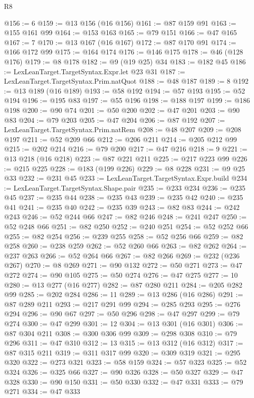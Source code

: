 \begin{lexlean}{R8}
\begin{coremodule}
@156 := 6
@159 := @13 @156 (@16 @156)
@161 := @87 @159 @91
@163 := @155 @161 @99
@164 := @153 @163
@165 := @79 @151
@166 := @47 @165
@167 := 7
@170 := @13 @167 (@16 @167)
@172 := @87 @170 @91
@174 := @166 @172 @99
@175 := @164 @174
@176 := @146 @175
@178 := @46 (@128 @176)
@179 := @8 @178
@182 := @9 (@19 @25) @34
@183 := @182 @45
@186 := LexLeanTarget.TargetSyntax.Expr.let @23 @31
@187 := LexLeanTarget.TargetSyntax.Prim.natQuot
@188 := @48 @187
@189 := 8
@192 := @13 @189 (@16 @189)
@193 := @58 @192
@194 := @57 @193
@195 := @52 @194
@196 := @195 @83
@197 := @55 @196
@198 := @188 @197
@199 := @186 @198
@200 := @90 @74
@201 := @50 @200
@202 := @47 @201
@203 := @90 @83
@204 := @79 @203
@205 := @47 @204
@206 := @87 @192
@207 := LexLeanTarget.TargetSyntax.Prim.natRem
@208 := @48 @207
@209 := @208 @197
@211 := @52 @209 @66
@212 := @206 @211
@214 := @205 @212 @99
@215 := @202 @214
@216 := @79 @200
@217 := @47 @216
@218 := 9
@221 := @13 @218 (@16 @218)
@223 := @87 @221 @211
@225 := @217 @223 @99
@226 := @215 @225
@228 := @183 (@199 @226)
@229 := @8 @228
@231 := @9 @25 @33
@232 := @231 @45
@233 := LexLeanTarget.TargetSyntax.Expr.build
@234 := LexLeanTarget.TargetSyntax.Shape.pair
@235 := @233 @234
@236 := @235 @45
@237 := @235 @44
@238 := @235 @43
@239 := @235 @42
@240 := @235 @41
@241 := @235 @40
@242 := @235 @39
@243 := @82 @83
@244 := @242 @243
@246 := @52 @244 @66
@247 := @82 @246
@248 := @241 @247
@250 := @52 @248 @66
@251 := @82 @250
@252 := @240 @251
@254 := @52 @252 @66
@255 := @82 @254
@256 := @239 @255
@258 := @52 @256 @66
@259 := @82 @258
@260 := @238 @259
@262 := @52 @260 @66
@263 := @82 @262
@264 := @237 @263
@266 := @52 @264 @66
@267 := @82 @266
@269 := @232 (@236 @267)
@270 := @8 @269
@271 := @90 @132
@272 := @50 @271
@273 := @47 @272
@274 := @90 @105
@275 := @50 @274
@276 := @47 @275
@277 := 10
@280 := @13 @277 (@16 @277)
@282 := @87 @280 @211
@284 := @205 @282 @99
@285 := @202 @284
@286 := 11
@289 := @13 @286 (@16 @286)
@291 := @87 @289 @211
@293 := @217 @291 @99
@294 := @285 @293
@295 := @276 @294
@296 := @90 @67
@297 := @50 @296
@298 := @47 @297
@299 := @79 @274
@300 := @47 @299
@301 := 12
@304 := @13 @301 (@16 @301)
@306 := @87 @304 @211
@308 := @300 @306 @99
@309 := @298 @308
@310 := @79 @296
@311 := @47 @310
@312 := 13
@315 := @13 @312 (@16 @312)
@317 := @87 @315 @211
@319 := @311 @317 @99
@320 := @309 @319
@321 := @295 @320
@322 := @273 @321
@323 := @58 @159
@324 := @57 @323
@325 := @52 @324
@326 := @325 @66
@327 := @90 @326
@328 := @50 @327
@329 := @47 @328
@330 := @90 @150
@331 := @50 @330
@332 := @47 @331
@333 := @79 @271
@334 := @47 @333

\end{coremodule}
\end{lexlean}
